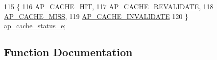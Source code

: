 \begin{DoxyCode}
115              \{
116     \hyperlink{group__MOD__CACHE_gga867e7fa27c3e0b612302472979849418aca6fc649c9fd4e686e2551134d92bc53}{AP\_CACHE\_HIT},
117     \hyperlink{group__MOD__CACHE_gga867e7fa27c3e0b612302472979849418a4088313cdf09ea437ce07e6240e417e6}{AP\_CACHE\_REVALIDATE},
118     \hyperlink{group__MOD__CACHE_gga867e7fa27c3e0b612302472979849418addcbc5ac2ab6f50c600c9f769a9db5d6}{AP\_CACHE\_MISS},
119     \hyperlink{group__MOD__CACHE_gga867e7fa27c3e0b612302472979849418a85ffd5041c638d8673f691378e812a32}{AP\_CACHE\_INVALIDATE}
120 \} \hyperlink{group__MOD__CACHE_ga867e7fa27c3e0b612302472979849418}{ap\_cache\_status\_e};
\end{DoxyCode}


\subsection{Function Documentation}
